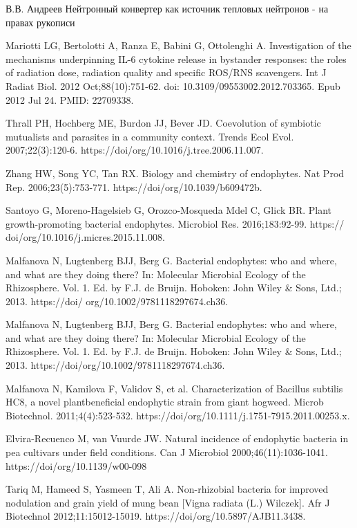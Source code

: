 \documentclass[11pt]{article}
\begin{document}
\begin{thebibliography}{3}
В.В. Андреев Нейтронный конвертер как источник тепловых нейтронов - на правах рукописи

 Mariotti LG, Bertolotti A, Ranza E, Babini G, Ottolenghi A. Investigation of the mechanisms underpinning IL-6 cytokine release in bystander responses: the roles of radiation dose, radiation quality and specific ROS/RNS scavengers. Int J Radiat Biol. 2012 Oct;88(10):751-62. doi: 10.3109/09553002.2012.703365. Epub 2012 Jul 24. PMID: 22709338.

Thrall PH, Hochberg ME, Burdon JJ, Bever JD. Coevolution of symbiotic mutualists and parasites in a community context. Trends Ecol Evol. 2007;22(3):120-6. https://doi/org/10.1016/j.tree.2006.11.007.

Zhang HW, Song YC, Tan RX. Biology and chemistry
of endophytes. Nat Prod Rep. 2006;23(5):753-771.
https://doi/org/10.1039/b609472b.

Santoyo G, Moreno-Hagelsieb G, Orozco-Mosqueda
Mdel C, Glick BR. Plant growth-promoting bacterial
endophytes. Microbiol Res. 2016;183:92-99. https://
doi/org/10.1016/j.micres.2015.11.008.

Malfanova N, Lugtenberg BJJ, Berg G. Bacterial
endophytes: who and where, and what are they doing
there? In: Molecular Microbial Ecology of the
Rhizosphere. Vol. 1. Ed. by F.J. de Bruijn. Hoboken:
John Wiley \& Sons, Ltd.; 2013. https://doi/
org/10.1002/9781118297674.ch36.


Malfanova N, Lugtenberg BJJ, Berg G. Bacterial
endophytes: who and where, and what are they doing
there? In: Molecular Microbial Ecology of the
Rhizosphere. Vol. 1. Ed. by F.J. de Bruijn. Hoboken:
John Wiley \& Sons, Ltd.; 2013. https://doi/org/10.1002/9781118297674.ch36.


Malfanova N, Kamilova F, Validov S, et al. Characterization
of Bacillus subtilis HC8, a novel plantbeneficial
endophytic strain from giant hogweed. Microb
Biotechnol. 2011;4(4):523-532. https://doi/org/10.1111/j.1751-7915.2011.00253.x.

Elvira-Recuenco M, van Vuurde JW. Natural incidence of endophytic bacteria in pea cultivars under field conditions. Can J Microbiol 2000;46(11):1036-1041.
https://doi/org/10.1139/w00-098

Tariq M, Hameed S, Yasmeen T, Ali A. Non-rhizobial
bacteria for improved nodulation and grain yield
of mung bean [Vigna radiata (L.) Wilczek]. Afr
J Biotechnol 2012;11:15012-15019. https://doi/org/10.5897/AJB11.3438.


\end{thebibliography}
\end{document}
